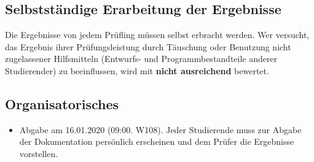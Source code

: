 \subsection{Selbstständige Erarbeitung der Ergebnisse}
Die Ergebnisse von jedem Prüfling müssen selbst erbracht werden. Wer versucht, das Ergebnis ihrer Prüfungsleistung durch Täuschung oder Benutzung nicht zugelassener Hilfsmitteln (Entwurfs- und Programmbestandteile anderer Studierender) zu beeinflussen, wird mit \textbf{nicht ausreichend} bewertet.
\subsection{Organisatorisches}
\begin{itemize}
  \item Abgabe am 16.01.2020 (09:00. W108). Jeder Studierende muss zur Abgabe der Dokumentation persönlich erscheinen und dem Prüfer die Ergebnisse vorstellen.
\end{itemize}
